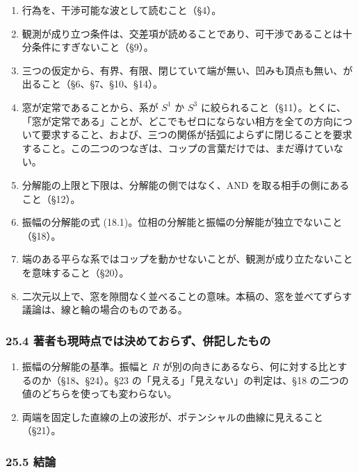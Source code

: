 \documentclass[
  a4paper,
]{ltjsarticle}
\providecommand{\tightlist}{%
  \setlength{\itemsep}{0pt}\setlength{\parskip}{0pt}}
\begin{document}
\begin{enumerate}
\def\labelenumi{\arabic{enumi}.}
\tightlist
\item
  行為を、干渉可能な波として読むこと（§4）。
\item
  観測が成り立つ条件は、交差項が読めることであり、可干渉であることは十分条件にすぎないこと（§9）。
\item
  三つの仮定から、有界、有限、閉じていて端が無い、凹みも頂点も無い、が出ること（§6、§7、§10、§14）。
\item
  窓が定常であることから、系が \(S^1\) か \(S^3\)
  に絞られること（§11）。とくに、「窓が定常である」ことが、どこでもゼロにならない相方を全ての方向について要求すること、および、三つの関係が括弧によらずに閉じることを要求すること。この二つのつなぎは、コップの言葉だけでは、まだ導けていない。
\item
  分解能の上限と下限は、分解能の側ではなく、AND
  を取る相手の側にあること（§12）。
\item
  振幅の分解能の式
  (18.1)。位相の分解能と振幅の分解能が独立でないこと（§18）。
\item
  端のある平らな系ではコップを動かせないことが、観測が成り立たないことを意味すること（§20）。
\item
  二次元以上で、窓を隙間なく並べることの意味。本稿の、窓を並べてずらす議論は、線と輪の場合のものである。
\end{enumerate}

\subsubsection{25.4
著者も現時点では決めておらず、併記したもの}\label{ux8457ux8005ux3082ux73feux6642ux70b9ux3067ux306fux6c7aux3081ux3066ux304aux3089ux305aux4f75ux8a18ux3057ux305fux3082ux306e}

\begin{enumerate}
\def\labelenumi{\arabic{enumi}.}
\tightlist
\item
  振幅の分解能の基準。振幅と \(R\)
  が別の向きにあるなら、何に対する比とするのか（§18、§24）。§23
  の「見える」「見えない」の判定は、§18
  の二つの値のどちらを使っても変わらない。
\item
  両端を固定した直線の上の波形が、ポテンシャルの曲線に見えること（§21）。
\end{enumerate}

\subsubsection{25.5 結論}\label{ux7d50ux8ad6}
\end{document}
